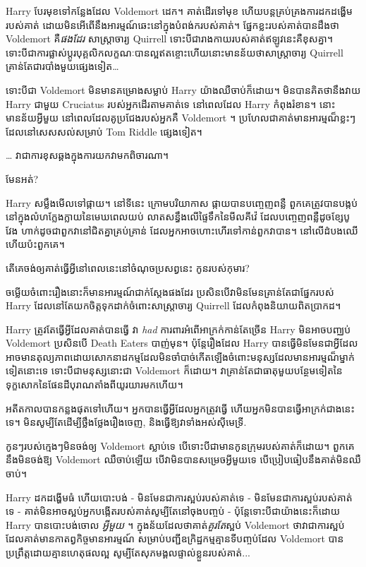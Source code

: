 {Harry បែរមុខទៅកន្លែងដែល Voldemort ដេក។ គាត់ដើរទៅមុខ ហើយបន្តគ្រប់គ្រងការដកដង្ហើមរបស់គាត់ ដោយមិនអើពើនឹងអារម្មណ៍ឆេះនៅក្នុងបំពង់ករបស់គាត់។ ផ្នែកខ្លះរបស់គាត់បានដឹងថា Voldemort គឺ\emph{ផងដែរ} សាស្រ្តាចារ្យ Quirrell ទោះបីជារាងកាយរបស់គាត់ឥឡូវនេះគឺខុសគ្នា។ ទោះបីជាការផ្លាស់ប្តូរបុគ្គលិកលក្ខណៈបានល្អឥតខ្ចោះហើយនោះមានន័យថាសាស្រ្តាចារ្យ Quirrell គ្រាន់តែជារបាំងមួយផ្សេងទៀត…

ទោះបីជា Voldemort មិនមានគម្រោងសម្លាប់ Harry យ៉ាងឈឺចាប់ក៏ដោយ។ មិន​បាន​គិត​ថា​នឹង​វាយ​ Harry ជាមួយ Cruciatus របស់​អ្នក​ដើរ​តាម​គាត់​ទេ នៅ​ពេល​ដែល Harry កំពុង​រំខាន។ នោះមានន័យអ្វីមួយ នៅពេលដែលគូប្រជែងរបស់អ្នកគឺ Voldemort ។ ប្រហែលជាគាត់មានអារម្មណ៏ខ្លះៗដែលនៅសេសសល់សម្រាប់ Tom Riddle ផ្សេងទៀត។

… វា​ជា​ការ​ខុស​ឆ្គង​ក្នុង​ការ​យក​វា​មក​ពិចារណា។

មែនអត់?

Harry សម្លឹងមើលទៅផ្កាយ។ នៅទីនេះ ក្រោមបរិយាកាស ផ្កាយបានបញ្ចេញពន្លឺ ពួកគេត្រូវបានបង្កប់នៅក្នុងលំហក្លែងក្លាយនៃមេឃពេលយប់ លាតសន្ធឹងលើផ្ទៃទឹកនៃមីលគីវ៉េ ដែលបញ្ចេញពន្លឺដូចខ្សែបូវែង ហាក់ដូចជាពួកវានៅជិតគ្នាគ្រប់គ្រាន់ ដែលអ្នកអាចហោះហើរទៅកាន់ពួកវាបាន។ នៅលើដំបងឈើហើយប៉ះពួកគេ។

តើ​គេ​ចង់​ឲ្យ​គាត់​ធ្វើ​អ្វី​នៅ​ពេល​នេះ​នៅ​ចំណុច​ប្រសព្វ​នេះ កូន​របស់​កុមារ?

ចម្លើយចំពោះរឿងនោះក៏មានអារម្មណ៍ជាក់ស្តែងផងដែរ ប្រសិនបើវាមិនមែនគ្រាន់តែជាផ្នែករបស់ Harry ដែលនៅតែយកចិត្តទុកដាក់ចំពោះសាស្រ្តាចារ្យ Quirrell ដែលកំពុងនិយាយពិតប្រាកដ។

Harry ត្រូវតែធ្វើអ្វីដែលគាត់បានធ្វើ វា \emph{had} ការពារអំពើអាក្រក់កាន់តែច្រើន Harry មិនអាចបញ្ឈប់ Voldemort ប្រសិនបើ Death Eaters បាញ់មុន។ ប៉ុន្តែរឿងដែល Harry បានធ្វើមិនមែនជាអ្វីដែលអាចមានតុល្យភាពដោយសោកនាដកម្មដែលមិនចាំបាច់កើតឡើងចំពោះមនុស្សដែលមានអារម្មណ៏ម្នាក់ទៀតនោះទេ ទោះបីជាមនុស្សនោះជា Voldemort ក៏ដោយ។ វាគ្រាន់តែជាធាតុមួយបន្ថែមទៀតនៃទុក្ខសោកនៃផែនដីបុរាណតាំងពីយូរយារមកហើយ។

អតីតកាលបានកន្លងផុតទៅហើយ។ អ្នកបានធ្វើអ្វីដែលអ្នកត្រូវធ្វើ ហើយអ្នកមិនបានធ្វើអាក្រក់ជាងនេះទេ។ មិន​សូម្បី​តែ​ដើម្បី​ថ្លឹងថ្លែង​រឿង​ចេញ, និង​ធ្វើ​ឱ្យ​វា​ទាំង​អស់​ស៊ីមេទ្រី.

កូនៗរបស់ក្មេងៗមិនចង់ឲ្យ Voldemort ស្លាប់ទេ បើទោះបីជាមានកូនក្រុមរបស់គាត់ក៏ដោយ។ ពួកគេ​នឹង​មិន​ចង់​ឱ្យ Voldemort ឈឺចាប់​ឡើយ បើ​វា​មិន​បាន​សម្រេច​អ្វី​មួយ​ទេ បើ​ប្រៀបធៀប​នឹង​គាត់​មិន​ឈឺចាប់។

Harry ដកដង្ហើមធំ ហើយបោះបង់ - មិនមែនជាការស្អប់របស់គាត់ទេ - មិនមែនជាការស្អប់របស់គាត់ទេ - គាត់មិនអាចស្អប់អ្នកបង្កើតរបស់គាត់សូម្បីតែនៅចុងបញ្ចប់ - ប៉ុន្តែទោះបីជាយ៉ាងនេះក៏ដោយ Harry បានបោះបង់ចោល \emph{ អ្វីមួយ } ។ ក្នុងន័យដែលថាគាត់\emph{គួរតែ}ស្អប់ Voldemort ថាវាជាការស្អប់ដែលគាត់មានកាតព្វកិច្ចមានអារម្មណ៍ សម្រាប់បញ្ជីឧក្រិដ្ឋកម្មគ្មានទីបញ្ចប់ដែល Voldemort បានប្រព្រឹត្តដោយគ្មានហេតុផលល្អ សូម្បីតែសុភមង្គលផ្ទាល់ខ្លួនរបស់គាត់...

}

